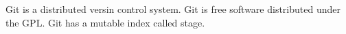 ﻿Git is a distributed  versin control system.
Git is free software distributed under the GPL.
Git has a mutable index called stage.